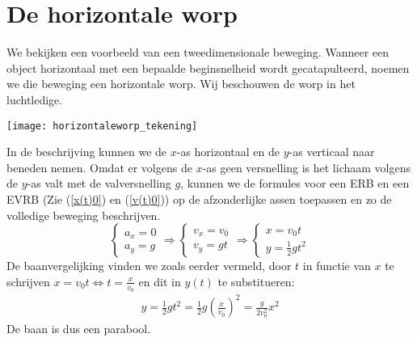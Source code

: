 \documentclass{ximera}
\begin{document}
	\author{Bart Lambregs}
    \xmsource




	\section{De horizontale worp}

	We bekijken een voorbeeld van een tweedimensionale beweging. Wanneer een object horizontaal met een bepaalde beginsnelheid wordt gecatapulteerd, noemen we die beweging een horizontale worp. Wij beschouwen de worp in het luchtledige.
	\begin{image}
	
	\texttt{[image: horizontaleworp\_tekening]}
	\end{image}
	In de beschrijving kunnen we de $x$-as horizontaal en de $y$-as verticaal naar beneden nemen. Omdat er volgens de $x$-as geen versnelling is het lichaam volgens de $y$-as valt met de valversnelling $g$, kunnen we de formules voor een ERB en een EVRB (Zie (\ref{x(t)0}) en (\ref{v(t)0})) op de afzonderlijke assen toepassen en zo de volledige beweging beschrijven.%
	\begin{equation*}
	\left\{
	\begin{array}{l}
	a_x=0\\
	a_y=g
	\end{array}
	\right.
	\Rightarrow
	\left\{
	\begin{array}{l}
	v_x=v_0\\
	v_y=gt
	\end{array}
	\right.
	\Rightarrow
	\left\{
	\begin{array}{l}
	x=v_0t\\
	y=\frac{1}{2}gt^2
	\end{array}
	\right.
	\end{equation*}
	De baanvergelijking vinden we zoals eerder vermeld, door $t$ in functie van $x$ te schrijven $x=v_0t\Leftrightarrow t=\frac{x}{v_0}$ en dit in $y(t)$ te substitueren:
	\begin{eqnarray*}
	y=\frac{1}{2}gt^2=\frac{1}{2}g\left(\frac{x}{v_0}\right)^2=\frac{g}{2v_0^2}x^2
	\end{eqnarray*}
	De baan is dus een parabool.
	
\end{document}
